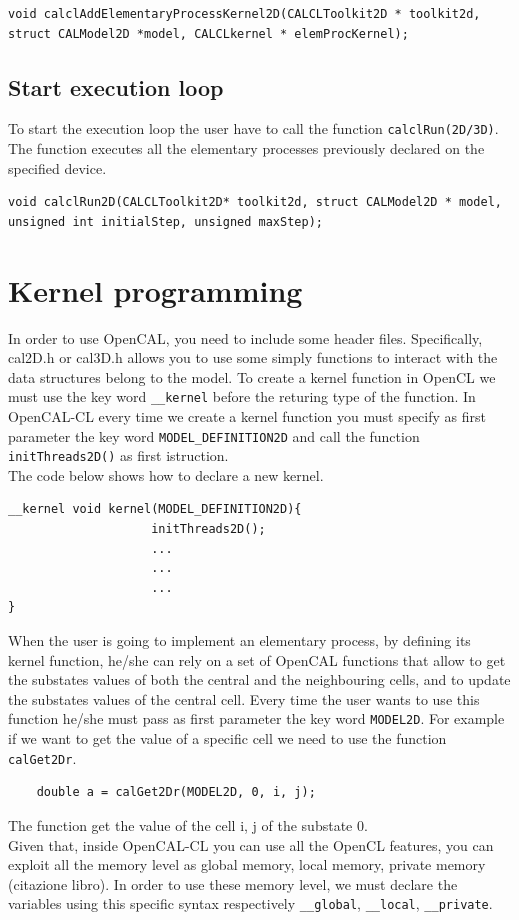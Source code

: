 \begin{lstlisting}
void calclAddElementaryProcessKernel2D(CALCLToolkit2D * toolkit2d, struct CALModel2D *model, CALCLkernel * elemProcKernel);
\end{lstlisting}


\subsection{Start execution loop}

To start the execution loop the user have to call the function \verb'calclRun(2D/3D)'. The function executes
all the elementary processes previously declared on the specified device.

\begin{lstlisting}
void calclRun2D(CALCLToolkit2D* toolkit2d, struct CALModel2D * model, unsigned int initialStep,	unsigned maxStep);
\end{lstlisting}


\section{Kernel programming} 

In order to use OpenCAL, you need to include some header files.
Specifically, cal2D.h or cal3D.h allows you to use some simply 
functions to interact with the data structures belong to the model.
To create a kernel function in OpenCL we must use 
the key word \verb'__kernel' before the returing 
type of the function. In OpenCAL-CL every time 
we create a kernel function you must specify as first parameter
 the key word  \verb'MODEL_DEFINITION2D' and call the function \verb'initThreads2D()' as first 
 istruction.\\
The code below shows how to declare a new kernel.
\begin{lstlisting} 
__kernel void kernel(MODEL_DEFINITION2D){
					initThreads2D();
					...
					...
					...
}
\end{lstlisting}

When the user is going to implement an elementary process, by defining its
kernel function, he/she can rely on a set of OpenCAL functions that allow to
get the substates values of both the central and the neighbouring cells, and to
update the substates values of the central cell. Every time the user wants to use 
this function he/she must pass as first parameter the key word  \verb'MODEL2D'. 
For example if we want to get the value of a specific cell we need to use 
the function \verb'calGet2Dr'.
\begin{lstlisting} 
	double a = calGet2Dr(MODEL2D, 0, i, j);
\end{lstlisting}
The function get the value of the cell i, j of the substate 0.\\
Given that, inside OpenCAL-CL you can use all the OpenCL features,
you can exploit all the memory level as global memory, local memory, 
private memory (citazione libro). In order to use these memory level, 
we must declare the variables using this specific syntax respectively \verb'__global', 
\verb'__local', \verb'__private'.

